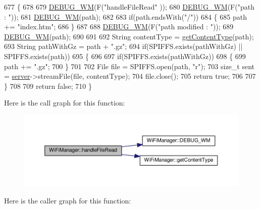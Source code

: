 \begin{DoxyCode}
677 \{
678 
679     \hyperlink{class_wi_fi_manager_ae5f595c670ccbcf9a191baf50f5c7c26}{DEBUG\_WM}(F(\textcolor{stringliteral}{"handleFileRead"} ));
680     \hyperlink{class_wi_fi_manager_ae5f595c670ccbcf9a191baf50f5c7c26}{DEBUG\_WM}(F(\textcolor{stringliteral}{"path : "}));
681     \hyperlink{class_wi_fi_manager_ae5f595c670ccbcf9a191baf50f5c7c26}{DEBUG\_WM}(path);
682 
683     \textcolor{keywordflow}{if}(path.endsWith(\textcolor{stringliteral}{"/"}))
684     \{
685         path += \textcolor{stringliteral}{"index.htm"};
686     \}
687 
688     \hyperlink{class_wi_fi_manager_ae5f595c670ccbcf9a191baf50f5c7c26}{DEBUG\_WM}(F(\textcolor{stringliteral}{"path modified : "}));
689     \hyperlink{class_wi_fi_manager_ae5f595c670ccbcf9a191baf50f5c7c26}{DEBUG\_WM}(path);
690     
691     
692     String contentType = \hyperlink{class_wi_fi_manager_a40f123fd290c3e331c9785d19a88f3b8}{getContentType}(path);
693     String pathWithGz = path + \textcolor{stringliteral}{".gz"};
694     \textcolor{keywordflow}{if}(SPIFFS.exists(pathWithGz) || SPIFFS.exists(path))
695     \{
696 
697         \textcolor{keywordflow}{if}(SPIFFS.exists(pathWithGz))
698         \{
699             path += \textcolor{stringliteral}{".gz"};
700         \}
701 
702         File file = SPIFFS.open(path, \textcolor{stringliteral}{"r"});
703         \textcolor{keywordtype}{size\_t} sent = \hyperlink{class_wi_fi_manager_a509523a01c0395cf0dc235b074f2a5ea}{server}->streamFile(file, contentType);
704         file.close();
705         \textcolor{keywordflow}{return} \textcolor{keyword}{true};
706 
707     \}
708 
709     \textcolor{keywordflow}{return} \textcolor{keyword}{false};
710 \}
\end{DoxyCode}
Here is the call graph for this function\+:\nopagebreak
\begin{figure}[H]
\begin{center}
\leavevmode
\includegraphics[width=350pt]{d4/dc8/class_wi_fi_manager_a9e802fa4ca834a622f058a7176f47806_cgraph}
\end{center}
\end{figure}
Here is the caller graph for this function\+:\nopagebreak
